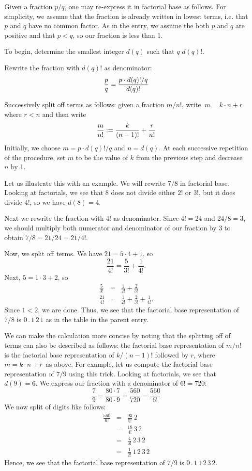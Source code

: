 \documentclass[12pt]{article}
\begin{document}
Given a fraction $p/q$, one may re-express it in factorial
base as follows.  For simplicity, we assume that the 
fraction is already written in lowest terms, i.e. that
$p$ and $q$ have no common factor.  As in the 
entry, we assume the both $p$ and $q$ are positive and
that $p < q$, so our fraction is less than 1.

To begin, determine the smallest integer $d(q)$ such that $q$ 
 $d(q)!$.

Rewrite the fraction with $d(q)!$ as denominator:
\[
{p \over q} = {p \cdot d(q)!/q \over d(q)!}
\]

Successively split off terms as follows: given a
fraction $m/n!$, write\, $m = k \cdot n + r$\, where
$r < n$ and then write
\[
{m \over n!} := {k \over (n-1)!} + {r \over n!}
\]
Initially, we choose $m = p \cdot d(q)!/q$ and
$n = d(q)$.  At each successive repetition of the
procedure, set $m$ to be the value of $k$ from
the previous step and decrease $n$ by 1.

Let us illustrate this with an example.  We
will rewrite $7/8$ in factorial base.  Looking 
at factorials, we see that $8$ does not divide
either $2!$ or $3!$, but it does divide $4!$,
so we have $d(8) = 4$.

Next we rewrite the fraction with $4!$ as
denominator.  Since $4! = 24$ and $24/8 = 3$,
we should multiply both numerator and denominator
of our fraction by $3$ to obtain $7/8 = 21/24 = 
21/4!$.

Now, we split off terms.  We have $21 = 5 \cdot 4 +
1$, so
\[
\frac{21}{4!} = \frac{5}{3!} + \frac{1}{4!}.
\] 
Next, $5 = 1 \cdot 3 + 2$, so
\begin{eqnarray*}
\frac{5}{3!} &=& \frac{1}{2!} + \frac{2}{3!} \\
\frac{21}{4!} &=& \frac{1}{2!} + \frac{2}{3!} +
\frac{1}{4!}.
\end{eqnarray*}
Since $1 < 2$, we are done.  Thus, we see that the
factorial base representation of $7/8$ is 
$0 \, . \, 1 \, 2 \, 1$ as in the table in the 
parent entry.

We can make the calculation more concise by noting
that the splitting off of terms can also be described 
as follows:  the factorial base representation of
$m/n!$ is the factorial base representation of
$k/(n-1)!$ followed by $r$, where\, $m = k \cdot n
+ r$\, as above.  For example, let us compute the
factorial base representation of $7/9$ using this
trick.  Looking at factorials, we see that $d(9) = 6$.
We express our fraction with a denominator of $6! = 720$:
\[
\frac{7}{9} = \frac{80 \cdot 7}{80 \cdot 9} =
\frac{560}{720} = \frac{560}{6!}
\]
We now split of digits like follows:
\begin{eqnarray*}
\frac{560}{6!} &=& \frac{93}{5!} \, 2 \\
&=& \frac{18}{4!} \, 3 \, 2 \\
&=& \frac{4}{3!} \, 2 \, 3 \, 2 \\
&=& \frac{1}{2!} \, 1 \, 2 \, 3 \, 2 
\end{eqnarray*}
Hence, we see that the factorial base representation
of $7/9$ is $0 \, . \, 1 \, 1 \, 2 \, 3 \, 2$.
\end{document}
